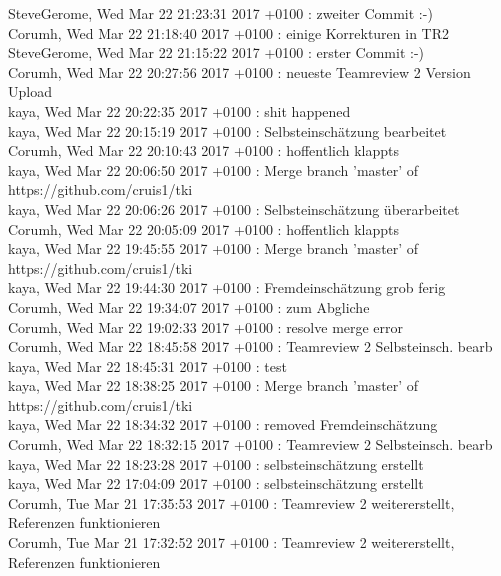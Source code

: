 SteveGerome, Wed Mar 22 21:23:31 2017 +0100 : zweiter Commit :-)\\
Corumh, Wed Mar 22 21:18:40 2017 +0100 : einige Korrekturen in TR2\\
SteveGerome, Wed Mar 22 21:15:22 2017 +0100 : erster Commit :-)\\
Corumh, Wed Mar 22 20:27:56 2017 +0100 : neueste Teamreview 2 Version Upload\\
kaya, Wed Mar 22 20:22:35 2017 +0100 : shit happened\\
kaya, Wed Mar 22 20:15:19 2017 +0100 : Selbsteinschätzung bearbeitet\\
Corumh, Wed Mar 22 20:10:43 2017 +0100 : hoffentlich klappts\\
kaya, Wed Mar 22 20:06:50 2017 +0100 : Merge branch 'master' of https://github.com/cruis1/tki\\
kaya, Wed Mar 22 20:06:26 2017 +0100 : Selbsteinschätzung überarbeitet\\
Corumh, Wed Mar 22 20:05:09 2017 +0100 : hoffentlich klappts\\
kaya, Wed Mar 22 19:45:55 2017 +0100 : Merge branch 'master' of https://github.com/cruis1/tki\\
kaya, Wed Mar 22 19:44:30 2017 +0100 : Fremdeinschätzung grob ferig\\
Corumh, Wed Mar 22 19:34:07 2017 +0100 : zum Abgliche\\
Corumh, Wed Mar 22 19:02:33 2017 +0100 : resolve merge error\\
Corumh, Wed Mar 22 18:45:58 2017 +0100 : Teamreview 2 Selbsteinsch. bearb\\
kaya, Wed Mar 22 18:45:31 2017 +0100 : test\\
kaya, Wed Mar 22 18:38:25 2017 +0100 : Merge branch 'master' of https://github.com/cruis1/tki\\
kaya, Wed Mar 22 18:34:32 2017 +0100 : removed Fremdeinschätzung\\
Corumh, Wed Mar 22 18:32:15 2017 +0100 : Teamreview 2 Selbsteinsch. bearb\\
kaya, Wed Mar 22 18:23:28 2017 +0100 : selbsteinschätzung erstellt\\
kaya, Wed Mar 22 17:04:09 2017 +0100 : selbsteinschätzung erstellt\\
Corumh, Tue Mar 21 17:35:53 2017 +0100 : Teamreview 2 weitererstellt, Referenzen funktionieren\\
Corumh, Tue Mar 21 17:32:52 2017 +0100 : Teamreview 2 weitererstellt, Referenzen funktionieren\\
